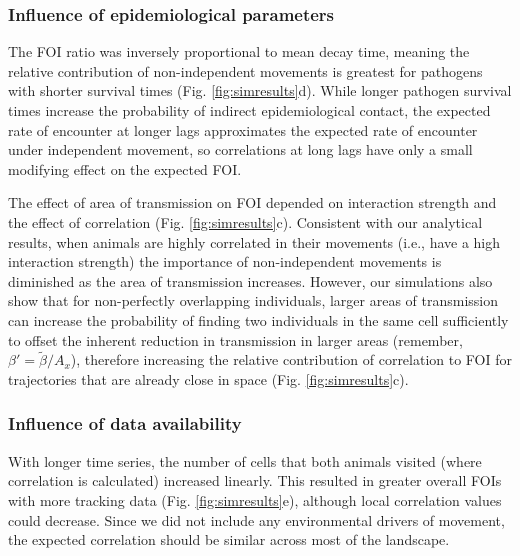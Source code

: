 \documentclass[letterpaper]{article}
\begin{document}
\subsubsection*{Influence of epidemiological parameters}

The FOI ratio was inversely proportional to mean decay time, meaning the relative contribution of non-independent movements is greatest for pathogens with shorter survival times (Fig. \ref{fig:simresults}d). While longer pathogen survival times increase the probability of indirect epidemiological contact, the expected rate of encounter at longer lags approximates the expected rate of encounter under independent movement, so correlations at long lags have only a small modifying effect on the expected FOI. %

The effect of area of transmission on FOI depended on interaction strength and the effect of correlation (Fig. \ref{fig:simresults}c). Consistent with our analytical results, when animals are highly correlated in their movements (i.e., have a high interaction strength) the importance of non-independent movements is diminished as the area of transmission increases.
However, our simulations also show that for non-perfectly overlapping individuals, larger areas of transmission can increase the probability of finding two individuals in the same cell sufficiently to offset the inherent reduction in transmission in larger areas (remember, $\beta' = \tilde{\beta} / A_x$), therefore increasing the relative contribution of correlation to FOI for trajectories that are already close in space (Fig. \ref{fig:simresults}c).

\subsubsection*{Influence of data availability}

With longer time series, the number of cells that both animals visited (where correlation is calculated) increased linearly. This resulted in greater overall FOIs %
with more tracking data (Fig. \ref{fig:simresults}e), although local correlation values could decrease. 
Since we did not include any environmental drivers of movement, the expected correlation should be similar across most of the landscape. 
\end{document}
